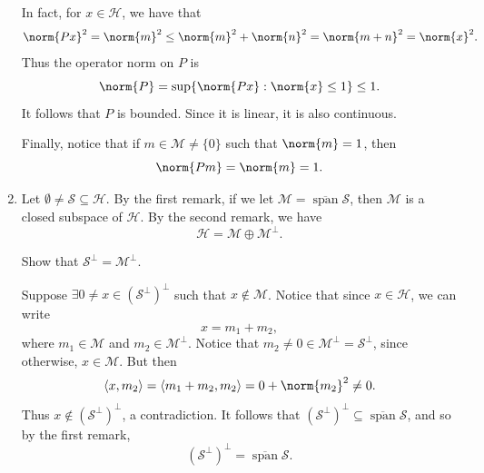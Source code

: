 \documentclass[notoc,notitlepage]{tufte-book}
\DeclareMathOperator{\Span}{span}
\begin{document}
\begin{remark}
\begin{enumerate}
      In fact, for $x \in \mathcal{H}$, we have that
      \begin{equation*}
        \norm{Px}^2 = \norm{m}^2 \leq \norm{m}^2 + \norm{n}^2
                   = \norm{m + n}^2 = \norm{x}^2.
      \end{equation*}
      Thus the operator norm on $P$ is
      \begin{equation*}
        \norm{P} = \sup \{ \norm{Px} : \norm{x} \leq 1 \} \leq 1.
      \end{equation*}
      It follows that $P$ is bounded. Since it is linear,
      it is also continuous.

      Finally, notice that if $m \in \mathcal{M} \neq \{ 0 \}$ such that
      $\norm{m} = 1$, then
      \begin{equation*}
        \norm{Pm} = \norm{m} = 1.
      \end{equation*}

    \item Let $\emptyset \neq \mathcal{S} \subseteq \mathcal{H}$.
      By the first remark, if we let
      $\mathcal{M} = \overline{\Span} \mathcal{S}$,
      then $\mathcal{M}$ is a closed subspace of $\mathcal{H}$.
      By the second remark, we have
      \begin{equation*}
        \mathcal{H} = \mathcal{M} \oplus \mathcal{M}^{\perp}.
      \end{equation*}
      \begin{ex}
        Show that $\mathcal{S}^{\perp} = \mathcal{M}^{\perp}$.
      \end{ex}

      Suppose $\exists 0 \neq x \in \left( \mathcal{S}^\perp \right)^\perp$
      such that $x \notin \mathcal{M}$.
      Notice that since $x \in \mathcal{H}$, we can write
      \begin{equation*}
        x = m_1 + m_2,
      \end{equation*}
      where $m_1 \in \mathcal{M}$ and $m_2 \in \mathcal{M}^\perp$.
      Notice that $m_2 \neq 0 \in \mathcal{M}^\perp = \mathcal{S}^\perp$,
      since otherwise, $x \in \mathcal{M}$.
      But then
      \begin{equation*}
        \langle x, m_2 \rangle = \langle m_1 + m_2, m_2 \rangle
        = 0 + \norm{m_2}^2 \neq 0.
      \end{equation*}
      Thus $x \notin \left( \mathcal{S}^\perp \right)^\perp$,
      a contradiction.
      It follows that $\left( \mathcal{S}^\perp \right)^\perp \subseteq
      \overline{\Span} \mathcal{S}$, and so by the first remark,
      \begin{equation*}
        \left( \mathcal{S}^\perp \right)^\perp = \overline{\Span} \mathcal{S}.
      \end{equation*}
  \end{enumerate}
\end{remark}
\end{document}
